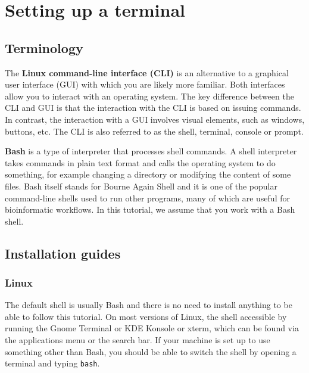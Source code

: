 \documentclass[
  letterpaper,
  DIV=11,
  numbers=noendperiod]{scrreprt}
\author{}
\date{}
\renewcommand*\contentsname{Table of contents}
\newcommand\contentsname{Table of contents}
\begin{document}

\renewcommand*\contentsname{Table of contents}
{
\hypersetup{linkcolor=}
\setcounter{tocdepth}{2}
\tableofcontents
}
\chapter{Setting up a terminal}\label{setting-up-a-terminal}

\section{Terminology}\label{terminology}

The \textbf{Linux command-line interface (CLI)} is an alternative to a
graphical user interface (GUI) with which you are likely more familiar.
Both interfaces allow you to interact with an operating system. The key
difference between the CLI and GUI is that the interaction with the CLI
is based on issuing commands. In contrast, the interaction with a GUI
involves visual elements, such as windows, buttons, etc. The CLI is also
referred to as the shell, terminal, console or prompt.

\textbf{Bash} is a type of interpreter that processes shell commands. A
shell interpreter takes commands in plain text format and calls the
operating system to do something, for example changing a directory or
modifying the content of some files. Bash itself stands for Bourne Again
Shell and it is one of the popular command-line shells used to run other
programs, many of which are useful for bioinformatic workflows. In this
tutorial, we assume that you work with a Bash shell.

\section{Installation guides}\label{installation-guides}

\subsection{Linux}\label{linux}

The default shell is usually Bash and there is no need to install
anything to be able to follow this tutorial. On most versions of Linux,
the shell accessible by running the Gnome Terminal or KDE Konsole or
xterm, which can be found via the applications menu or the search bar.
If your machine is set up to use something other than Bash, you should
be able to switch the shell by opening a terminal and typing
\texttt{bash}.
\end{document}
